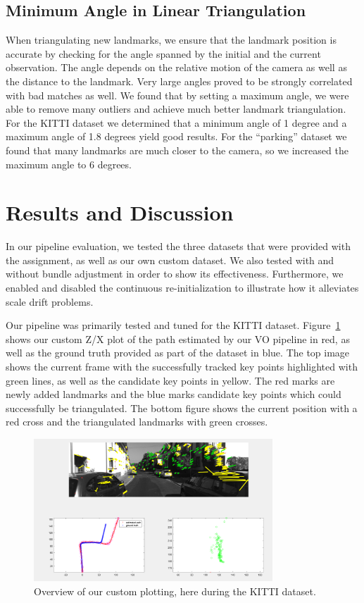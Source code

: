 \documentclass[11pt]{article}
\begin{document}
\subsection{Minimum Angle in Linear Triangulation}
When triangulating new landmarks, we ensure that the landmark position is accurate by checking for the angle spanned by the initial and the current observation. The angle depends on the relative motion of the camera as well as the distance to the landmark.
Very large angles proved to be strongly correlated with bad matches as well. We found that by setting a maximum angle, we were able to remove many outliers and achieve much better landmark triangulation. 
For the KITTI dataset we determined that a minimum angle of 1 degree and a maximum angle of 1.8 degrees yield good results. For the “parking” dataset we found that many landmarks are much closer to the camera, so we increased the maximum angle to 6 degrees.

\section{Results and Discussion}
In our pipeline evaluation, we tested the three datasets that were provided with the assignment, as well as our own custom dataset. We also tested with and without bundle adjustment in order to show its effectiveness. Furthermore, we enabled and disabled the continuous re-initialization to illustrate how it alleviates scale drift problems.

Our pipeline was primarily tested and tuned for the KITTI dataset. Figure~\ref{fig:overview} shows our custom Z/X plot of the path estimated by our VO pipeline in red, as well as the ground truth provided as part of the dataset in blue. The top image shows the current frame with the successfully tracked key points highlighted with green lines, as well as the candidate key points in yellow. The red marks are newly added landmarks and the blue marks candidate key points which could successfully be triangulated. The bottom figure shows the current position with a red cross and the triangulated landmarks with green crosses.

\begin{figure}[h]
	\centering
	\includegraphics[width=0.8\textwidth]{images/overview}
	\caption{Overview of our custom plotting, here during the KITTI dataset.}
	\label{fig:overview}
\end{figure}
\end{document}
